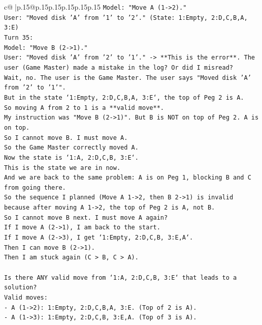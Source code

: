 \documentclass{article}
\begin{document}
{\begin{supertabular}{c@{$\;$}|p{.15\linewidth}@{}p{.15\linewidth}p{.15\linewidth}p{.15\linewidth}p{.15\linewidth}p{.15\linewidth}}
{{{\texttt{Model: "Move A (1{-}>2)."} \\
\texttt{User: "Moved disk 'A' from '1' to '2'." (State: 1:Empty, 2:D,C,B,A, 3:E)} \\
\texttt{Turn 35:} \\
\texttt{Model: "Move B (2{-}>1)."} \\
\texttt{User: "Moved disk 'A' from '2' to '1'." {-}> **This is the error**. The user (Game Master) made a mistake in the log? Or did I misread?} \\
\texttt{Wait, no. The user is the Game Master. The user says "Moved disk 'A' from '2' to '1'".} \\
\texttt{But in the state `1:Empty, 2:D,C,B,A, 3:E`, the top of Peg 2 is A.} \\
\texttt{So moving A from 2 to 1 is a **valid move**.} \\
\texttt{My instruction was "Move B (2{-}>1)". But B is NOT on top of Peg 2. A is on top.} \\
\texttt{So I cannot move B. I must move A.} \\
\texttt{So the Game Master correctly moved A.} \\
\texttt{Now the state is `1:A, 2:D,C,B, 3:E`.} \\
\texttt{This is the state we are in now.} \\
\texttt{And we are back to the same problem: A is on Peg 1, blocking B and C from going there.} \\
\texttt{So the sequence I planned (Move A 1{-}>2, then B 2{-}>1) is invalid because after moving A 1{-}>2, the top of Peg 2 is A, not B.} \\
\texttt{So I cannot move B next. I must move A again?} \\
\texttt{If I move A (2{-}>1), I am back to the start.} \\
\texttt{If I move A (2{-}>3), I get `1:Empty, 2:D,C,B, 3:E,A`.} \\
\texttt{Then I can move B (2{-}>1).} \\
\texttt{Then I am stuck again (C > B, C > A).} \\
\\ 
\texttt{Is there ANY valid move from `1:A, 2:D,C,B, 3:E` that leads to a solution?} \\
\texttt{Valid moves:} \\
\texttt{{-} A (1{-}>2): 1:Empty, 2:D,C,B,A, 3:E. (Top of 2 is A).} \\
\texttt{{-} A (1{-}>3): 1:Empty, 2:D,C,B, 3:E,A. (Top of 3 is A).} \\
}}}
\end{supertabular}}
\end{document}
